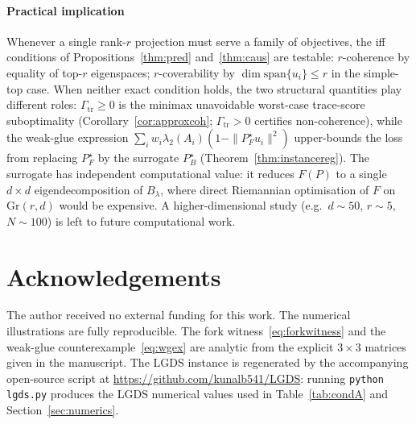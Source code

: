\documentclass[final,3p,times]{elsarticle}
\newcommand{\Gr}{\mathrm{Gr}}
\begin{document}
\paragraph{Practical implication}
Whenever a single rank-$r$ projection must serve a family of objectives,
the iff conditions of Propositions~\ref{thm:pred} and~\ref{thm:caus}
are testable: $r$-coherence by equality of top-$r$ eigenspaces;
$r$-coverability by $\dim\mathrm{span}\{u_i\}\le r$ in the simple-top
case.
When neither exact condition holds, the two structural quantities
play different roles: $\Gamma_{\mathrm{tr}}\ge 0$ is the minimax
unavoidable worst-case trace-score suboptimality
(Corollary~\ref{cor:approxcoh}; $\Gamma_{\mathrm{tr}}>0$ certifies
non-coherence), while the weak-glue expression
$\sum_i w_i\lambda_2(A_i)(1-\|P_F^\star u_i\|^2)$ upper-bounds the loss
from replacing $P_F^\star$ by the surrogate $P_B^\star$
(Theorem~\ref{thm:instancereg}).
The surrogate has independent computational value: it reduces $F(P)$
to a single $d\times d$ eigendecomposition of $B_\lambda$, where direct
Riemannian optimisation of $F$ on $\Gr(r,d)$ would be expensive.
A higher-dimensional study (e.g.\ $d\sim 50$, $r\sim 5$, $N\sim 100$)
is left to future computational work.

\section*{Acknowledgements}

The author received no external funding for this work.
The numerical illustrations are fully reproducible.
The fork witness~\eqref{eq:forkwitness} and the weak-glue
counterexample~\eqref{eq:wgex} are analytic from the explicit $3\times 3$
matrices given in the manuscript.
The LGDS instance is regenerated by the accompanying open-source script
at \url{https://github.com/kunalb541/LGDS}: running
\texttt{python lgds.py} produces the LGDS numerical values used in
Table~\ref{tab:condA} and Section~\ref{sec:numerics}.



\end{document}
